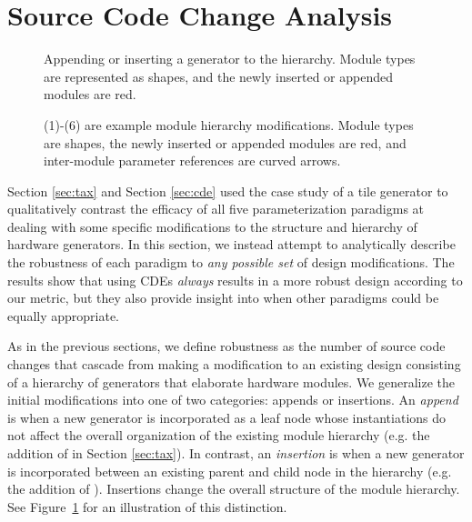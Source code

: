 \section{Source Code Change Analysis}
\label{sec:scca}

\begin{figure}[p]
\centering
{}
\caption{Appending or inserting a generator to the hierarchy.
Module types are represented as shapes, and the newly inserted or appended modules are red.}
\label{fig:both}
\end{figure}

\begin{figure}
\centering
{}
\caption{(1)-(6) are example module hierarchy modifications. 
Module types are shapes, the newly inserted or appended modules are red, and inter-module parameter references are curved arrows.}
\label{fig:attr}
\end{figure}

Section \ref{sec:tax} and Section \ref{sec:cde} used the case study of a tile generator to qualitatively contrast the efficacy of all five parameterization paradigms
at dealing with some specific modifications to the structure and hierarchy of hardware generators.
In this section, we instead attempt to analytically describe the robustness of each paradigm to \textit{any possible set} of design modifications.
The results show that using CDEs \textit{always} results in a more robust design according to our metric,
but they also provide insight into when other paradigms could be equally appropriate.

As in the previous sections, we define robustness as the number of source code changes that cascade from making a modification to an existing design
consisting of a hierarchy of generators that elaborate hardware modules.
We generalize the initial modifications into one of two categories: appends or insertions.
An \emph{append} is when a new generator is incorporated as a leaf node whose instantiations do not affect the overall organization of the existing module hierarchy
(e.g. the addition of  in Section \ref{sec:tax}).
In contrast, an \emph{insertion} is when a new generator is incorporated between an existing parent and child node in the hierarchy (e.g. the addition of ). 
Insertions change the overall structure of the module hierarchy.
See Figure~\ref{fig:both} for an illustration of this distinction.


